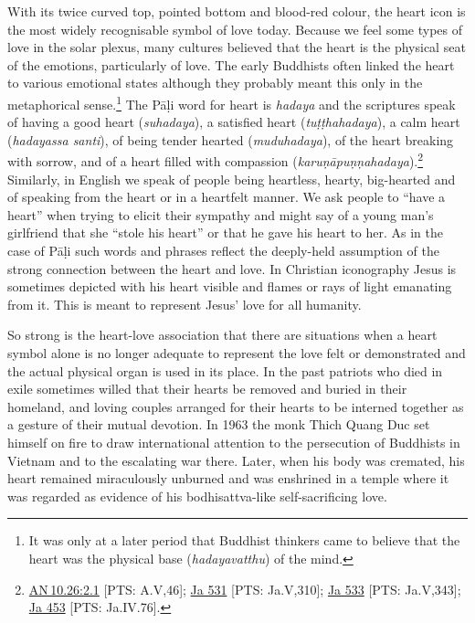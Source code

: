 \documentclass[10pt, openright]{book}
\begin{document}
With its twice curved top, pointed bottom and blood-red colour, the heart icon is the most widely recognisable symbol of love today. Because we feel some types of love in the solar plexus, many cultures believed that the heart is the physical seat of the emotions, particularly of love. The early Buddhists often linked the heart to various emotional states although they probably meant this only in the metaphorical sense.\footnote {It was only at a later period that Buddhist thinkers came to believe that the heart was the physical base (\textit{hadayavatthu}) of the mind.} The Pāḷi word for heart is \textit{hadaya} and the scriptures speak of having a good heart (\textit{suhadaya}), a satisfied heart (\textit{tuṭṭhahadaya}), a calm heart (\textit{hadayassa santi}), of being tender hearted (\textit{muduhadaya}), of the heart breaking with sorrow, and of a heart filled with compassion (\textit{karuṇāpuṇṇahadaya}).\footnote {\href{https://suttacentral.net/an10.26/en/sujato\#2.1}{AN 10.26:2.1} [PTS: A.V,46]; \href{https://suttacentral.net/ja531/en/francis?reference=main/pts#pts-vp-pli310}{Ja 531} [PTS: Ja.V,310]; \href{https://suttacentral.net/ja533/en/francis?reference=main/pts#pts-vp-pli343}{Ja 533} [PTS: Ja.V,343]; \href{https://suttacentral.net/ja453/en/rouse?reference=main/pts#pts-vp-pli76}{Ja 453} [PTS: Ja.IV.76].} Similarly, in English we speak of people being heartless, hearty, big-hearted and of speaking from the heart or in a heartfelt manner. We ask people to “have a heart” when trying to elicit their sympathy and might say of a young man’s girlfriend that she “stole his heart” or that he gave his heart to her. As in the case of Pāḷi such words and phrases reflect the deeply-held assumption of the strong connection between the heart and love. In Christian iconography Jesus is sometimes depicted with his heart visible and flames or rays of light emanating from it. This is meant to represent Jesus’ love for all humanity.


So strong is the heart-love association that there are situations when a heart symbol alone is no longer adequate to represent the love felt or demonstrated and the actual physical organ is used in its place. In the past patriots who died in exile sometimes willed that their hearts be removed and buried in their homeland, and loving couples arranged for their hearts to be interned together as a gesture of their mutual devotion. In 1963 the monk Thich Quang Duc set himself on fire to draw international attention to the persecution of Buddhists in Vietnam and to the escalating war there. Later, when his body was cremated, his heart remained miraculously unburned and was enshrined in a temple where it was regarded as evidence of his bodhisattva-like self-sacrificing love.
\end{document}
